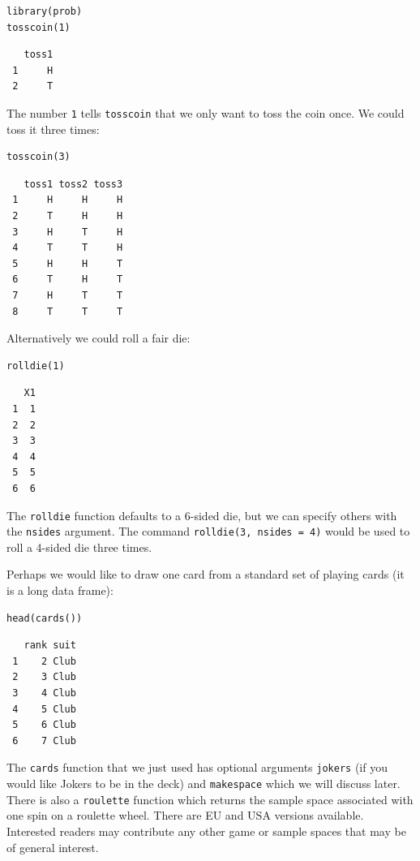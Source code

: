 \documentclass[captions=tableheading]{scrbook}
\begin{document}
\begin{verbatim}
library(prob)
tosscoin(1)
\end{verbatim}

\begin{verbatim}
   toss1
 1     H
 2     T
\end{verbatim}

The number \texttt{1} tells \texttt{tosscoin} that we only want to toss the coin once. We could toss it three times: 


\begin{verbatim}
tosscoin(3)
\end{verbatim}

\begin{verbatim}
   toss1 toss2 toss3
 1     H     H     H
 2     T     H     H
 3     H     T     H
 4     T     T     H
 5     H     H     T
 6     T     H     T
 7     H     T     T
 8     T     T     T
\end{verbatim}

Alternatively we could roll a fair die: 


\begin{verbatim}
rolldie(1)
\end{verbatim}

\begin{verbatim}
   X1
 1  1
 2  2
 3  3
 4  4
 5  5
 6  6
\end{verbatim}

The \texttt{rolldie} function defaults to a 6-sided die, but we can specify others with the \texttt{nsides} argument. The command \texttt{rolldie(3, nsides = 4)} would be used to roll a 4-sided die three times.

Perhaps we would like to draw one card from a standard set of playing cards (it is a long data frame):


\begin{verbatim}
head(cards())
\end{verbatim}

\begin{verbatim}
   rank suit
 1    2 Club
 2    3 Club
 3    4 Club
 4    5 Club
 5    6 Club
 6    7 Club
\end{verbatim}

The \texttt{cards} function that we just used has optional arguments \texttt{jokers} (if you would like Jokers to be in the deck) and \texttt{makespace} which we will discuss later. There is also a \texttt{roulette} function which returns the sample space associated with one spin on a roulette wheel. There are EU and USA versions available. Interested readers may contribute any other game or sample spaces that may be of general interest.
\end{document}
